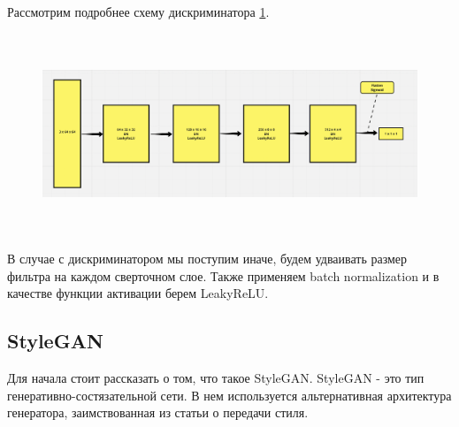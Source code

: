 Рассмотрим подробнее схему дискриминатора {\color{blue} \ref{fig.discriminator_scheme_DCGAN}}.
\begin{figure}
    \centering
    \includegraphics[height=60mm]{fig/discriminator_scheme_DCGAN.png}
    \caption{}
    \label{fig.discriminator_scheme_DCGAN}
\end{figure}
В случае с дискриминатором мы поступим иначе, будем удваивать размер фильтра на каждом сверточном слое. Также применяем batch normalization и в качестве функции активации берем LeakyReLU.

\subsection{StyleGAN}
Для начала стоит рассказать о том, что такое StyleGAN. StyleGAN - это тип генеративно-состязательной сети. В нем используется альтернативная архитектура генератора, заимствованная из статьи о передачи стиля. \cite{styletransfer}

